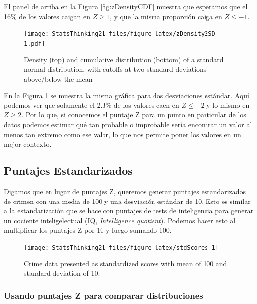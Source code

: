 \documentclass[
  12pt,
]{book}
\begin{document}
El panel de arriba en la Figura \ref{fig:zDensityCDF} muestra que esperamos que el 16\% de los valores caigan en \(Z\ge 1\), y que la misma proporción caiga en \(Z\le -1\).

\begin{figure}
\centering
\texttt{[image: StatsThinking21\_files/figure-latex/zDensity2SD-1.pdf]}
\caption{\label{fig:zDensity2SD}Density (top) and cumulative distribution (bottom) of a standard normal distribution, with cutoffs at two standard deviations above/below the mean}
\end{figure}

En la Figura \ref{fig:zDensity2SD} se muestra la misma gráfica para dos desviaciones estándar. Aquí podemos ver que solamente el 2.3\% de los valores caen en \(Z \le -2\) y lo mismo en \(Z \ge 2\). Por lo que, si conocemos el puntaje Z para un punto en particular de los datos podemos estimar qué tan probable o improbable sería encontrar un valor al menos tan extremo como ese valor, lo que nos permite poner los valores en un mejor contexto.

\hypertarget{puntajes-estandarizados}{%
\subsection{Puntajes Estandarizados}\label{puntajes-estandarizados}}

Digamos que en lugar de puntajes Z, queremos generar puntajes estandarizados de crimen con una media de 100 y una desviación estándar de 10. Esto es similar a la estandarización que se hace con puntajes de tests de inteligencia para generar un cociente inteligelectual (IQ, \emph{Intelligence quotient}). Podemos hacer esto al multiplicar los puntajes Z por 10 y luego sumando 100.

\begin{figure}
\texttt{[image: StatsThinking21\_files/figure-latex/stdScores-1]} \caption{Crime data presented as standardized scores with mean of  100 and standard deviation of 10.}\label{fig:stdScores}
\end{figure}

\hypertarget{usando-puntajes-z-para-comparar-distribuciones}{%
\subsubsection{Usando puntajes Z para comparar distribuciones}\label{usando-puntajes-z-para-comparar-distribuciones}}
\end{document}

